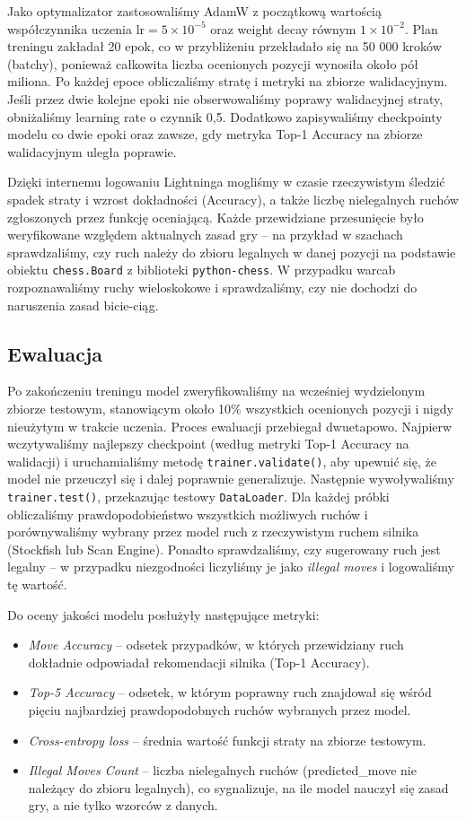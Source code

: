 \documentclass[12pt]{article}
\begin{document}
Jako optymalizator zastosowaliśmy AdamW z początkową wartością współczynnika uczenia \(\mathrm{lr} = 5 \times 10^{-5}\) oraz weight decay równym \(1 \times 10^{-2}\). Plan treningu zakładał 20 epok, co w przybliżeniu przekładało się na 50 000 kroków (batchy), ponieważ całkowita liczba ocenionych pozycji wynosiła około pół miliona. Po każdej epoce obliczaliśmy stratę i metryki na zbiorze walidacyjnym. Jeśli przez dwie kolejne epoki nie obserwowaliśmy poprawy walidacyjnej straty, obniżaliśmy learning rate o czynnik 0,5. Dodatkowo zapisywaliśmy checkpointy modelu co dwie epoki oraz zawsze, gdy metryka Top-1 Accuracy na zbiorze walidacyjnym uległa poprawie.

Dzięki internemu logowaniu Lightninga mogliśmy w czasie rzeczywistym śledzić spadek straty i wzrost dokładności (Accuracy), a także liczbę nielegalnych ruchów zgłoszonych przez funkcję oceniającą. Każde przewidziane przesunięcie było weryfikowane względem aktualnych zasad gry – na przykład w szachach sprawdzaliśmy, czy ruch należy do zbioru legalnych w danej pozycji na podstawie obiektu \texttt{chess.Board} z biblioteki \texttt{python-chess}. W przypadku warcab rozpoznawaliśmy ruchy wieloskokowe i sprawdzaliśmy, czy nie dochodzi do naruszenia zasad bicie-ciąg.

\subsection{Ewaluacja}

Po zakończeniu treningu model zweryfikowaliśmy na wcześniej wydzielonym zbiorze testowym, stanowiącym około 10\% wszystkich ocenionych pozycji i nigdy nieużytym w trakcie uczenia. Proces ewaluacji przebiegał dwuetapowo. Najpierw wczytywaliśmy najlepszy checkpoint (według metryki Top-1 Accuracy na walidacji) i uruchamialiśmy metodę \texttt{trainer.validate()}, aby upewnić się, że model nie przeuczył się i dalej poprawnie generalizuje. Następnie wywoływaliśmy \texttt{trainer.test()}, przekazując testowy \texttt{DataLoader}. Dla każdej próbki obliczaliśmy prawdopodobieństwo wszystkich możliwych ruchów i porównywaliśmy wybrany przez model ruch z rzeczywistym ruchem silnika (Stockfish lub Scan Engine). Ponadto sprawdzaliśmy, czy sugerowany ruch jest legalny – w przypadku niezgodności liczyliśmy je jako \emph{illegal moves} i logowaliśmy tę wartość.

Do oceny jakości modelu posłużyły następujące metryki:
\begin{itemize}
    \item \emph{Move Accuracy} – odsetek przypadków, w których przewidziany ruch dokładnie odpowiadał rekomendacji silnika (Top-1 Accuracy).
    \item \emph{Top-5 Accuracy} – odsetek, w którym poprawny ruch znajdował się wśród pięciu najbardziej prawdopodobnych ruchów wybranych przez model.
    \item \emph{Cross-entropy loss} – średnia wartość funkcji straty na zbiorze testowym.
    \item \emph{Illegal Moves Count} – liczba nielegalnych ruchów (predicted\_move nie należący do zbioru legalnych), co sygnalizuje, na ile model nauczył się zasad gry, a nie tylko wzorców z danych.
\end{itemize}
\end{document}
